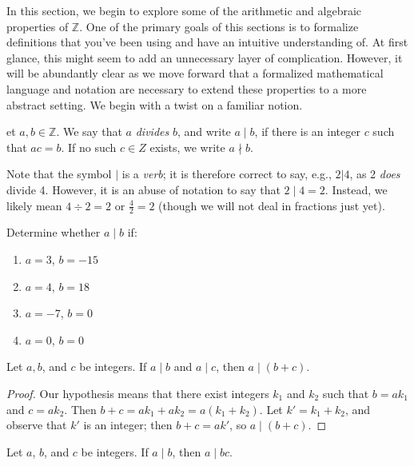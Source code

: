 \documentclass[english,course]{lecture}
\theoremstyle{plain}
\newenvironment{definition}[1]
  {\renewcommand\theinnerdefinition{#1}\innerdefinition}
  {\endinnerdefinition}
\def\Z{{\mathbb Z}}
\def\presnotes{}
\begin{document}
In this section, we begin to explore some of the arithmetic and algebraic properties of $\Z$. One of the primary goals of this sections is to formalize definitions that you've been using and have an intuitive understanding of. At first glance, this might seem to add an unnecessary layer of complication. However, it will be abundantly clear as we move forward that a formalized mathematical language and notation are necessary to extend these properties to a more abstract setting. We begin with a twist on a familiar notion.

\begin{definition}
	Let $a,b\in \Z$.
	We say that $a$ \emph{divides} $b$, and write $a\mid b$, if there is an integer $c$ such that $ac = b$.
	If no such $c\in Z$ exists, we write $a\nmid b$.
\end{definition}

Note that the symbol $|$ is a \emph{verb}; it is therefore correct to say, e.g., $2|4$, as 2 \emph{does} divide 4. 
However, it is an abuse of notation to say that $2\mid 4 = 2$. 
Instead, we likely mean $4\div 2 = 2$ or $\frac{4}{2} = 2$ (though we will not deal in fractions just yet).

\begin{exer}
	Determine whether $a\mid b$ if:
	\begin{enumerate}
		\item $a = 3$, $b = -15$
		\item $a = 4$, $b = 18$
		\item $a = -7$, $b = 0$
		\item $a = 0$, $b = 0$
	\end{enumerate}
\end{exer}

\presnotes

\begin{theorem}
	Let $a,b$, and $c$ be integers. If $a\mid b$ and $a\mid c$, then $a\mid (b+c)$.
\end{theorem}


\begin{proof} 
	Our hypothesis means that there exist integers $k_1$ and $k_2$ such that $b = a k_1$ and $c = a k_2$. 
	Then $b+c = a k_1 + a k_2 = a(k_1 + k_2)$.
	Let $k' = k_1 + k_2$, and observe that $k'$ is an integer; then $b+c = a k'$, so $a\mid (b+c)$.
\end{proof}

\presnotes

\begin{theorem}
	Let $a$, $b$, and $c$ be integers.
	If $a\mid b$, then $a\mid bc$.
\end{theorem}
\end{document}
